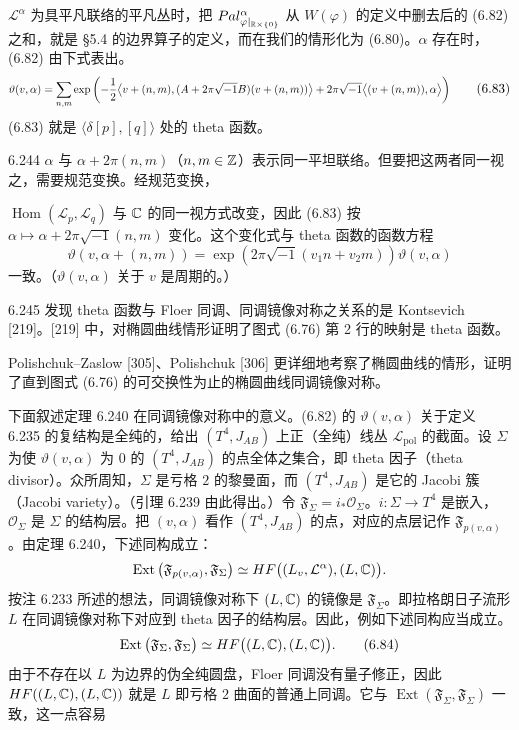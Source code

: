 $\mathcal{L}^\alpha$ 为具平凡联络的平凡丛时，把 $Pal^\alpha_{\varphi|_{\mathbb{R}\times\{0\}}}$ 从 $W(\varphi)$ 的定义中删去后的 (6.82) 之和，就是 §5.4 的边界算子的定义，而在我们的情形化为 (6.80)。$\alpha$ 存在时，(6.82) 由下式表出。
\begin{equation}
  \resizebox{0.97\linewidth}{!}{$\displaystyle \vartheta(v,\alpha)=\sum_{n,m}\exp\left(-\frac12\big\langle v+(n,m),(A+2\pi\sqrt{-1}B)(v+(n,m))\big\rangle +2\pi\sqrt{-1}\big\langle(v+(n,m)),\alpha\big\rangle\right) $} \tag{6.83}
\end{equation}
(6.83) 就是 $\langle\delta[p],[q]\rangle$ 处的 theta 函数。

\begin{remark}{6.244}
  $\alpha$ 与 $\alpha+2\pi(n,m)$（$n,m\in\mathbb{Z}$）表示同一平坦联络。但要把这两者同一视之，需要规范变换。经规范变换，

  $\operatorname{Hom}(\mathcal{L}_p,\mathcal{L}_q)$ 与 $\mathbb{C}$ 的同一视方式改变，因此 (6.83) 按 $\alpha\mapsto\alpha+2\pi\sqrt{-1}(n,m)$ 变化。这个变化式与 theta 函数的函数方程
  \[
    \vartheta(v,\alpha+(n,m))=\exp(2\pi\sqrt{-1}(v_1n+v_2m))\vartheta(v,\alpha)
  \]
  一致。（$\vartheta(v,\alpha)$ 关于 $v$ 是周期的。）
\end{remark}

\begin{remark}{6.245}
  发现 theta 函数与 Floer 同调、同调镜像对称之关系的是 Kontsevich [219]。[219] 中，对椭圆曲线情形证明了图式 (6.76) 第 2 行的映射是 theta 函数。

  Polishchuk–Zaslow [305]、Polishchuk [306] 更详细地考察了椭圆曲线的情形，证明了直到图式 (6.76) 的可交换性为止的椭圆曲线同调镜像对称。
\end{remark}

下面叙述定理 6.240 在同调镜像对称中的意义。(6.82) 的 $\vartheta(v,\alpha)$ 关于定义 6.235 的复结构是全纯的，给出 $(T^4,J_{AB})$ 上正（全纯）线丛 $\mathcal{L}_{\mathrm{pol}}$ 的截面。设 $\Sigma$ 为使 $\vartheta(v,\alpha)$ 为 $0$ 的 $(T^4,J_{AB})$ 的点全体之集合，即 theta 因子（theta divisor）。众所周知，$\Sigma$ 是亏格 $2$ 的黎曼面，而 $(T^4,J_{AB})$ 是它的 Jacobi 簇（Jacobi variety）。（引理 6.239 由此得出。）令 $\mathfrak{F}_\Sigma=i_*\mathcal{O}_\Sigma$。$i\colon\Sigma\to T^4$ 是嵌入，$\mathcal{O}_\Sigma$ 是 $\Sigma$ 的结构层。把 $(v,\alpha)$ 看作 $(T^4,J_{AB})$ 的点，对应的点层记作 $\mathfrak{F}_{p(v,\alpha)}$。由定理 6.240，下述同构成立：
\[
  \operatorname{Ext}\big(\mathfrak{F}_{p(v,\alpha)},\mathfrak{F}_\Sigma\big)
  \simeq HF\big((L_v,\mathcal{L}^\alpha),(L,\mathbb{C})\big).
\]
按注 6.233 所述的想法，同调镜像对称下 $(L,\mathbb{C})$ 的镜像是 $\mathfrak{F}_\Sigma$。即拉格朗日子流形 $L$ 在同调镜像对称下对应到 theta 因子的结构层。因此，例如下述同构应当成立。
\begin{equation}
  \operatorname{Ext}\big(\mathfrak{F}_\Sigma,\mathfrak{F}_\Sigma\big)
  \simeq HF\big((L,\mathbb{C}),(L,\mathbb{C})\big). \tag{6.84}
\end{equation}
由于不存在以 $L$ 为边界的伪全纯圆盘，Floer 同调没有量子修正，因此 $HF((L,\mathbb{C}),(L,\mathbb{C}))$ 就是 $L$ 即亏格 $2$ 曲面的普通上同调。它与 $\operatorname{Ext}(\mathfrak{F}_\Sigma,\mathfrak{F}_\Sigma)$ 一致，这一点容易


